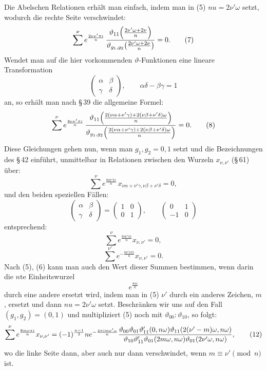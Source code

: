 \documentclass[11pt]{article}
\begin{document}
Die Abelschen Relationen erhält man einfach, indem man in (5) $nu=2\nu'\omega$ setzt,
wodurch die rechte Seite verschwindet:
\begin{equation}
\sum^\nu e^{\frac{2\nu\nu'\pi i}{n}}\,
{\vartheta_{11}\!\left({2\nu'\omega+2\nu\over n}\right)\over
 \vartheta_{g_1,g_2}\!\left({2\nu'\omega+2\nu\over n}\right)}
=0.
\tag{7}
\end{equation}
Wendet man auf die hier vorkommenden $\vartheta$-Funktionen eine lineare Transformation
\[
\begin{pmatrix}\alpha&\beta\\ \gamma&\delta\end{pmatrix},
\qquad \alpha\delta-\beta\gamma=1
\]
an, so erhält man nach \S\,39 die allgemeine Formel:
\begin{equation}
\sum^\nu e^{\frac{8\nu\nu'\pi i}{n}}\,
{\vartheta_{11}\!\left({2(\nu\alpha+\nu'\gamma)+2(\nu\beta+\nu'\delta)\omega\over n}\right)\over
 \vartheta_{g_1,g_2}\!\left({2(\nu\alpha+\nu'\gamma)+2(\nu\beta+\nu'\delta)\omega\over n}\right)}
=0.
\tag{8}
\end{equation}
Diese Gleichungen gehen nun, wenn man $g_1,g_2=0,1$ setzt und die Bezeichnungen des
\S\,42 einführt, unmittelbar in Relationen zwischen den Wurzeln $x_{\nu,\nu'}$ (\S\,61)
über:
\begin{equation}
\sum^\nu e^{\frac{8\nu\nu'\pi i}{n}}\,
x_{\nu\alpha+\nu'\gamma,\nu\beta+\nu'\delta}=0,
\tag{9}
\end{equation}
und den beiden speziellen Fällen:
\[
\begin{pmatrix}\alpha&\beta\\ \gamma&\delta\end{pmatrix}
=
\begin{pmatrix}1&0\\0&1\end{pmatrix},\qquad
\begin{pmatrix}0&1\\-1&0\end{pmatrix}
\]
entsprechend:
\begin{equation}
\sum^\nu e^{\frac{8\nu\nu'\pi i}{n}}x_{\nu,\nu'}=0,
\tag{10}
\end{equation}
\begin{equation}
\sum^{\nu'} e^{-\frac{8\nu'\nu\pi i}{n}}x_{\nu,\nu'}=0.
\tag{11}
\end{equation}
Nach (5), (6) kann man auch den Wert dieser Summen bestimmen, wenn darin die $n$te
Einheitswurzel
\[
e^{\frac{8\pi i}{n}}
\]
durch eine andere ersetzt wird, indem man in (5) $\nu'$ durch ein anderes Zeichen, $m$,
ersetzt und dann $nu=2\nu'\omega$ setzt. Beschränken wir uns auf den Fall
$(g_1,g_2)=(0,1)$ und multipliziert (5) noch mit $\vartheta_{00}:\vartheta_{10}$, so folgt:
\begin{equation}
\sum^\nu e^{\frac{8m\nu\pi i}{n}}x_{\nu,\nu'}=
(-1)^{\frac{n-1}{2}} n e^{-\frac{4\pi im\nu'\omega}{n}}
{\vartheta_{00}\vartheta_{01}\vartheta'_{11}(0,n\omega)
 \vartheta_{11}\!\left(2(\nu'-m)\omega,n\omega\right)\over
 \vartheta_{10}\vartheta'_{11}\vartheta_{01}(2m\omega,n\omega)
 \vartheta_{01}(2\nu'\omega,n\omega)},
\tag{12}
\end{equation}
wo die linke Seite dann, aber auch nur dann verschwindet, wenn $m\equiv\nu'\pmod n$ ist.
\end{document}
